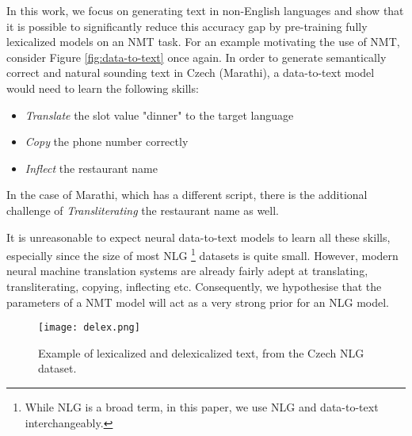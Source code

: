 \documentclass[11pt,a4paper]{article}
\begin{document}
In this work, we focus on generating text in non-English languages and show that it is possible to significantly reduce this accuracy gap by pre-training fully lexicalized models on an NMT task. For an example motivating the use of NMT, consider Figure \ref{fig:data-to-text} once again. In order to generate semantically correct and natural sounding text in Czech (Marathi), a data-to-text model would need to learn the following skills:
\begin{itemize}
    \item \textsl{Translate} the slot value "dinner" to the target language
    \item \textsl{Copy} the phone number correctly
    \item \textsl{Inflect} the restaurant name
\end{itemize}
In the case of Marathi, which has a different script, there is the additional challenge of \textsl{Transliterating} the restaurant name as well. \par
It is unreasonable to expect neural data-to-text models to learn all these skills, especially since the size of most NLG \footnote{While NLG is a broad term, in this paper, we use NLG and data-to-text interchangeably.} datasets is quite small. However, modern neural machine translation systems are already fairly adept at translating, transliterating, copying, inflecting etc. Consequently, we hypothesise that the parameters of a NMT model will act as a very strong prior for an NLG model. \par



\begin{figure}
\noindent\texttt{[image: delex.png]}
\caption{
Example of lexicalized and delexicalized text, from the Czech NLG dataset.
}
\label{fig:delex}
\end{figure} 
\end{document}
